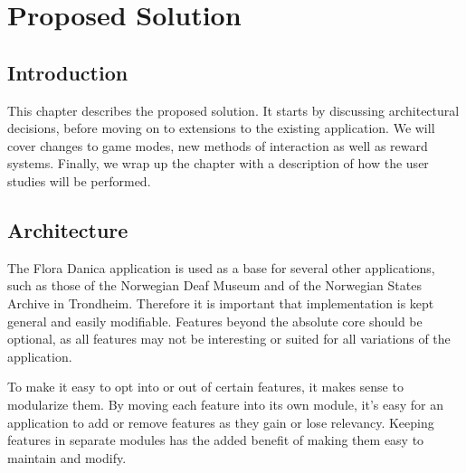 
\chapter{Proposed Solution}

\label{Chapter3}



\section{Introduction}

This chapter describes the proposed solution. It starts by discussing architectural decisions, before moving on to extensions to the existing application. We will cover changes to game modes, new methods of interaction as well as reward systems. Finally, we wrap up the chapter with a description of how the user studies will be performed.


\section{Architecture}

The Flora Danica application is used as a base for several other applications, such as those of the Norwegian Deaf Museum and of the Norwegian States Archive in Trondheim. Therefore it is important that implementation is kept general and easily modifiable. Features beyond the absolute core should be optional, as all features may not be interesting or suited for all variations of the application.

To make it easy to opt into or out of certain features, it makes sense to modularize them. By moving each feature into its own module, it's easy for an application to add or remove features as they gain or lose relevancy. Keeping features in separate modules has the added benefit of making them easy to maintain and modify.


